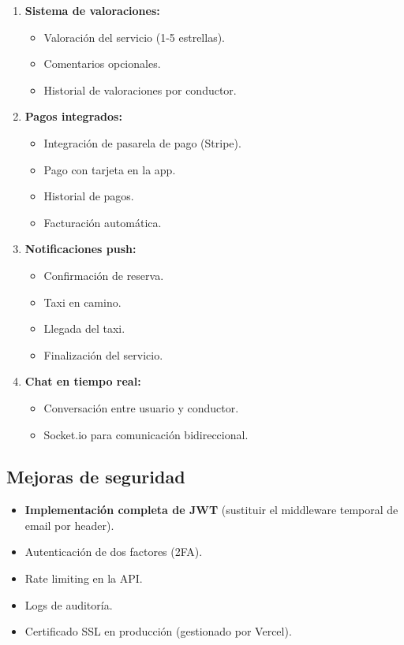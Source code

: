 \documentclass[12pt,a4paper]{article}
\begin{document}
\begin{enumerate}
    \item \textbf{Sistema de valoraciones:}
    \begin{itemize}
        \item Valoración del servicio (1-5 estrellas).
        \item Comentarios opcionales.
        \item Historial de valoraciones por conductor.
    \end{itemize}
    
    \item \textbf{Pagos integrados:}
    \begin{itemize}
        \item Integración de pasarela de pago (Stripe).
        \item Pago con tarjeta en la app.
        \item Historial de pagos.
        \item Facturación automática.
    \end{itemize}
    
    \item \textbf{Notificaciones push:}
    \begin{itemize}
        \item Confirmación de reserva.
        \item Taxi en camino.
        \item Llegada del taxi.
        \item Finalización del servicio.
    \end{itemize}
    
    \item \textbf{Chat en tiempo real:}
    \begin{itemize}
        \item Conversación entre usuario y conductor.
        \item Socket.io para comunicación bidireccional.
    \end{itemize}
\end{enumerate}

\subsection{Mejoras de seguridad}

\begin{itemize}
    \item \textbf{Implementación completa de JWT} (sustituir el middleware temporal de email por header).
    \item Autenticación de dos factores (2FA).
    \item Rate limiting en la API.
    \item Logs de auditoría.
    \item Certificado SSL en producción (gestionado por Vercel).
\end{itemize}
\end{document}
